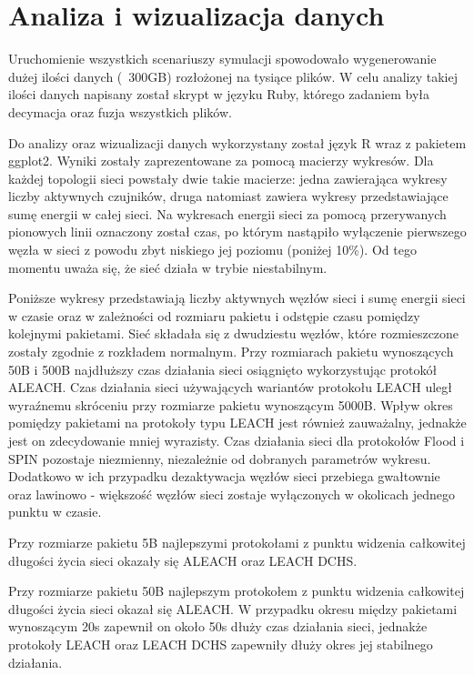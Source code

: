 \section{Analiza i wizualizacja danych}
Uruchomienie wszystkich scenariuszy symulacji spowodowało wygenerowanie dużej ilości danych (~300GB) rozłożonej na tysiące plików. W celu analizy takiej ilości danych napisany został skrypt w języku Ruby, którego zadaniem była decymacja oraz fuzja wszystkich plików.

Do analizy oraz wizualizacji danych wykorzystany został język R wraz z pakietem ggplot2. Wyniki zostały zaprezentowane za pomocą macierzy wykresów. Dla każdej topologii sieci powstały dwie takie macierze: jedna zawierająca wykresy liczby aktywnych czujników, druga natomiast zawiera wykresy przedstawiające sumę energii w całej sieci. Na wykresach energii sieci za pomocą przerywanych pionowych linii oznaczony został czas, po którym nastąpiło wyłączenie pierwszego węzła w sieci z powodu zbyt niskiego jej poziomu (poniżej 10\%). Od tego momentu uważa się, że sieć działa w trybie niestabilnym.

Poniższe wykresy przedstawiają liczby aktywnych węzłów sieci i sumę energii sieci w czasie oraz w zależności od rozmiaru pakietu i odstępie czasu pomiędzy kolejnymi pakietami. Sieć składała się z dwudziestu węzłów, które rozmieszczone zostały zgodnie z rozkładem normalnym.
Przy rozmiarach pakietu wynoszących 50B i 500B najdłuższy czas działania sieci osiągnięto wykorzystując protokół ALEACH. Czas działania sieci używających wariantów protokołu LEACH uległ wyraźnemu skróceniu przy rozmiarze pakietu wynoszącym 5000B. Wpływ okres pomiędzy pakietami na protokoły typu LEACH jest również zauważalny, jednakże jest on zdecydowanie mniej wyrazisty. Czas działania sieci dla protokołów Flood i SPIN pozostaje niezmienny, niezależnie od dobranych parametrów wykresu. Dodatkowo w ich przypadku dezaktywacja węzłów sieci przebiega gwałtownie oraz lawinowo - większość węzłów sieci zostaje wyłączonych w okolicach jednego punktu w czasie.

Przy rozmiarze pakietu 5B najlepszymi protokołami z punktu widzenia całkowitej długości życia sieci okazały się ALEACH oraz LEACH DCHS.

Przy rozmiarze pakietu 50B najlepszym protokołem z punktu widzenia całkowitej długości życia sieci okazał się ALEACH. W przypadku okresu między pakietami wynoszącym 20s zapewnił on około 50s dłuży czas działania sieci, jednakże protokoły LEACH oraz LEACH DCHS zapewniły dłuży okres jej stabilnego działania.

